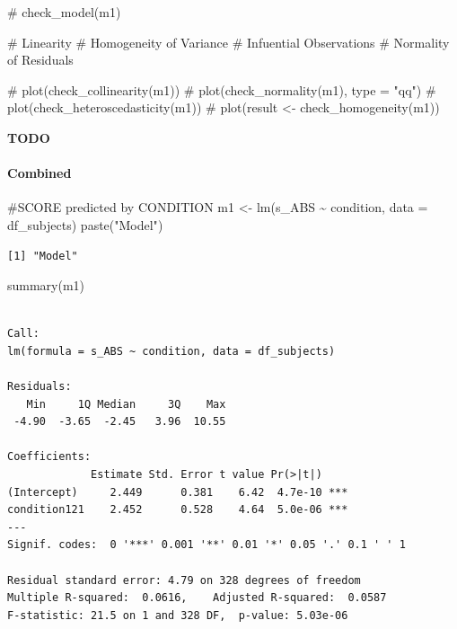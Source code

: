 \documentclass[
  letterpaper,
  DIV=11,
  numbers=noendperiod]{scrreprt}
\let\oldparagraph\paragraph
\renewcommand{\paragraph}[1]{\oldparagraph{#1}\mbox{}}
\newenvironment{Shaded}{\begin{snugshade}}{\end{snugshade}}
\newcommand{\AttributeTok}[1]{\textcolor[rgb]{0.40,0.45,0.13}{#1}}
\newcommand{\CommentTok}[1]{\textcolor[rgb]{0.37,0.37,0.37}{#1}}
\newcommand{\FunctionTok}[1]{\textcolor[rgb]{0.28,0.35,0.67}{#1}}
\newcommand{\NormalTok}[1]{\textcolor[rgb]{0.00,0.23,0.31}{#1}}
\newcommand{\OtherTok}[1]{\textcolor[rgb]{0.00,0.23,0.31}{#1}}
\newcommand{\SpecialCharTok}[1]{\textcolor[rgb]{0.37,0.37,0.37}{#1}}
\newcommand{\StringTok}[1]{\textcolor[rgb]{0.13,0.47,0.30}{#1}}
\begin{document}
\begin{Shaded}
\begin{Highlighting}[]
\CommentTok{\# check\_model(m1)}

\CommentTok{\# Linearity}
\CommentTok{\# Homogeneity of Variance}
\CommentTok{\# Infuential Observations}
\CommentTok{\# Normality of Residuals}

\CommentTok{\# plot(check\_collinearity(m1))}
\CommentTok{\# plot(check\_normality(m1), type = "qq")}
\CommentTok{\# plot(check\_heteroscedasticity(m1))}
\CommentTok{\# plot(result \textless{}{-} check\_homogeneity(m1))}
\end{Highlighting}
\end{Shaded}

\textbf{TODO}

\hypertarget{combined}{%
\paragraph{Combined}\label{combined}}

\begin{Shaded}
\begin{Highlighting}[]
\CommentTok{\#SCORE predicted by CONDITION}
\NormalTok{m1 }\OtherTok{\textless{}{-}} \FunctionTok{lm}\NormalTok{(s\_ABS }\SpecialCharTok{\textasciitilde{}}\NormalTok{ condition, }\AttributeTok{data =}\NormalTok{ df\_subjects)}
\FunctionTok{paste}\NormalTok{(}\StringTok{"Model"}\NormalTok{)}
\end{Highlighting}
\end{Shaded}

\begin{verbatim}
[1] "Model"
\end{verbatim}

\begin{Shaded}
\begin{Highlighting}[]
\FunctionTok{summary}\NormalTok{(m1)}
\end{Highlighting}
\end{Shaded}

\begin{verbatim}

Call:
lm(formula = s_ABS ~ condition, data = df_subjects)

Residuals:
   Min     1Q Median     3Q    Max 
 -4.90  -3.65  -2.45   3.96  10.55 

Coefficients:
             Estimate Std. Error t value Pr(>|t|)    
(Intercept)     2.449      0.381    6.42  4.7e-10 ***
condition121    2.452      0.528    4.64  5.0e-06 ***
---
Signif. codes:  0 '***' 0.001 '**' 0.01 '*' 0.05 '.' 0.1 ' ' 1

Residual standard error: 4.79 on 328 degrees of freedom
Multiple R-squared:  0.0616,    Adjusted R-squared:  0.0587 
F-statistic: 21.5 on 1 and 328 DF,  p-value: 5.03e-06
\end{verbatim}
\end{document}
